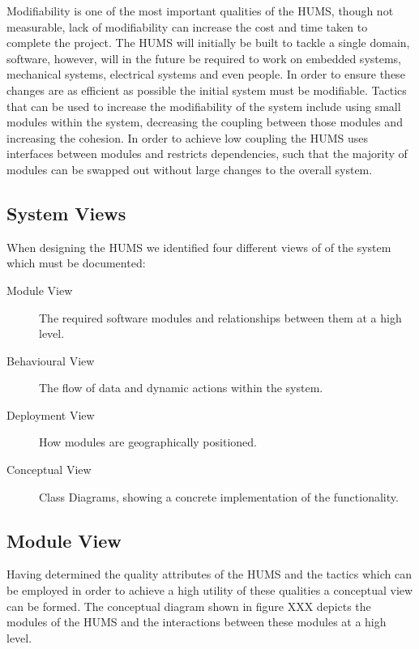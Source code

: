 \documentclass[10pt,a4paper]{article}
\begin{document}
Modifiability is one of the most important qualities of the HUMS, though not measurable, 
lack of modifiability can increase the cost and time taken to complete the project. The 
HUMS will initially be built to tackle a single domain, software, however, will in the future 
be required to work on embedded systems, mechanical systems, electrical systems and 
even people. In order to ensure these changes are as efficient as possible the initial system 
must be modifiable. Tactics that can be used to increase the modifiability of the system include using small modules within the system, decreasing the coupling between those modules and increasing the cohesion. In order to achieve low coupling  the HUMS uses interfaces between modules and restricts dependencies, such that the majority of modules can be swapped out without large changes to the overall system.

\subsection{System Views}
When designing the HUMS we identified four different views of of the system which must be documented:
\begin{description}
\item[Module View] The required software modules and relationships between them at a high level.
\item[Behavioural View] The flow of data and dynamic actions within the system.
\item[Deployment View] How modules are geographically positioned.
\item[Conceptual View] Class Diagrams, showing a concrete implementation of the functionality.
\end{description}

\subsection{Module View}
Having determined the quality attributes of the HUMS and the tactics which can be employed in order to achieve a high utility of these qualities a conceptual view can be formed. The conceptual diagram shown in figure XXX depicts the modules of the HUMS and the interactions between these modules at a high level.
\end{document}
